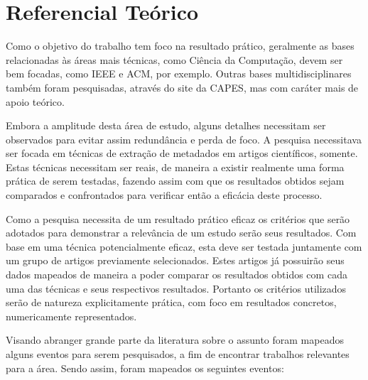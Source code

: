 
\chapter{Referencial Teórico}
\label{cha:library}






\begin{textedited}
Como o objetivo do trabalho tem foco na resultado prático, geralmente as bases relacionadas às áreas mais técnicas, como Ciência da Computação, devem ser bem focadas, como IEEE e ACM, por exemplo. Outras bases multidisciplinares também foram pesquisadas, através do site da CAPES, mas com caráter mais de apoio teórico.
\end{textedited}

Embora a amplitude desta área de estudo, alguns detalhes necessitam ser observados para evitar assim redundância e perda de foco. A pesquisa necessitava ser focada em técnicas de extração de metadados em artigos científicos, somente. Estas técnicas necessitam ser reais, de maneira a existir realmente uma forma prática de serem testadas, fazendo assim com que os resultados obtidos sejam comparados e confrontados para verificar então a eficácia deste processo.

Como a pesquisa necessita de um resultado prático eficaz os critérios que serão adotados para demonstrar a relevância de um estudo serão seus resultados. Com base em uma técnica potencialmente eficaz, esta deve ser testada juntamente com um grupo de artigos previamente selecionados. Estes artigos já possuirão seus dados mapeados de maneira a poder comparar os resultados obtidos com cada uma das técnicas e seus respectivos resultados. Portanto os critérios utilizados serão de natureza explicitamente prática, com foco em resultados concretos, numericamente representados.


\begin{textedited}
Visando abranger grande parte da literatura sobre o assunto foram mapeados alguns eventos para serem pesquisados, a fim de encontrar trabalhos relevantes para a área. Sendo assim, foram mapeados os seguintes eventos:
\end{textedited}

